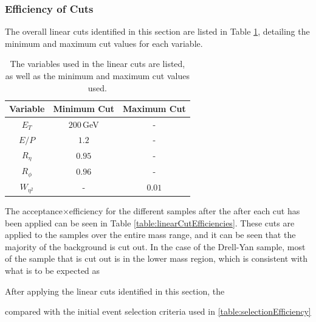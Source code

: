 \documentclass{article}
\begin{document}

\subsubsection{Efficiency of Cuts}

The overall linear cuts identified in this section are listed in Table \ref{table:linearCuts}, detailing the minimum and maximum cut values for each variable.

\begin{table}[h!t]
\centering
\caption{The variables used in the linear cuts are listed, as well as the minimum and maximum cut values used. \label{table:linearCuts}}
\begin{tabular}{|c|c|c| } 
\hline
Variable & Minimum Cut & Maximum Cut\\\hline
$E_T$ & $200\,$GeV  & - \\\hline
$E/P$ & $1.2$  & - \\\hline
$R_{\eta}$ & $0.95$ & - \\\hline
$R_{\phi}$ & $0.96$ & -\\\hline
$W_{\eta^2}$ & - & $0.01$\\\hline
\end{tabular}
\end{table}

The acceptance$\times$efficiency for the different samples after the after each cut has been applied can be seen in Table \ref{table:linearCutEfficiencies}. These cuts are applied to the samples over the entire mass range, and it can be seen that the majority of the background is cut out. In the case of the Drell-Yan sample, most of the sample that is cut out is in the lower mass region, which is consistent with what is to be expected as 

After applying the linear cuts identified in this section, the 

compared with the initial event selection criteria used in \ref{table:selectionEfficiency}
\end{document}
